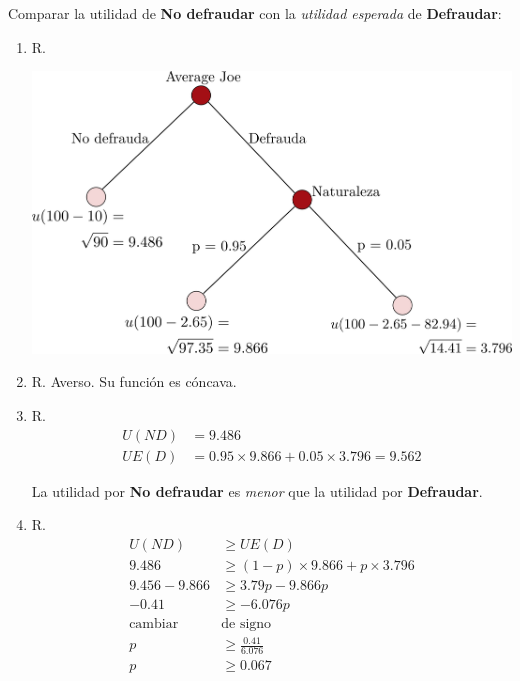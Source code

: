 \documentclass[12pt]{scrartcl} %
\begin{document}
\begin{Exercise}[name={Respuesta}]



  Comparar la utilidad de \textbf{No defraudar} con la \textit{utilidad esperada} de \textbf{Defraudar}:

  \begin{enumerate}
    \setlength{\itemsep}{0pt}
    \setlength{\parskip}{0pt}
    \setlength{\parsep}{0pt}
    \item R.
          \begin{center}
            \includegraphics[scale=0.65]{p2tarea1a.png}
          \end{center}
    \item R. Averso. Su función es cóncava.
    \item R.
          \begin{align*}
            U(ND) & = 9.486                                         \\
            UE(D) & = 0.95 \times 9.866 + 0.05 \times 3.796 = 9.562
          \end{align*}

          La utilidad por \textbf{No defraudar} es \textit{menor} que la utilidad por \textbf{Defraudar}.
    \item R.
          \begin{align*}
            U(ND)           & \geq UE(D)                               \\
            9.486           & \geq (1-p) \times 9.866 + p \times 3.796 \\
            9.456-9.866     & \geq 3.79p - 9.866p                      \\
            -0.41           & \geq -6.076p                             \\
            \text{cambiar } & \text{de signo}                          \\
            p               & \geq \frac{0.41}{6.076}                  \\
            p               & \geq 0.067
          \end{align*}


\end{enumerate}
\end{Exercise}
\end{document}
